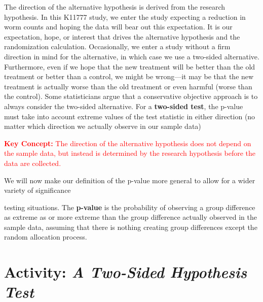 \documentclass[
]{report}
\theoremstyle{definition}
\theoremstyle{definition}
\theoremstyle{definition}
\theoremstyle{definition}
\theoremstyle{remark}
\begin{document}
The direction of the alternative hypothesis is derived from the research hypothesis. In this K11777 study, we
enter the study expecting a reduction in worm counts and hoping the data will bear out this expectation. It is
our expectation, hope, or interest that drives the alternative hypothesis and the randomization calculation. Occasionally,
we enter a study without a firm direction in mind for the alternative, in which case we use a two-sided
alternative. Furthermore, even if we hope that the new treatment will be better than the old treatment or better
than a control, we might be wrong---it may be that the new treatment is actually worse than the old treatment
or even harmful (worse than the control). Some statisticians argue that a conservative objective approach is to
always consider the two-sided alternative. For a \textbf{two-sided test}, the p-value must take into account extreme
values of the test statistic in either direction (no matter which direction we actually observe in our sample data)

\Large

\textbf{\textcolor{red}{Key Concept:}}
\textcolor{red}{The direction of the alternative hypothesis does not depend on the sample data, but instead is determined
by the research hypothesis before the data are collected.}

\normalsize

We will now make our definition of the p-value more general to allow for a wider variety of significance

testing situations. The \textbf{p-value} is the probability of observing a group difference as extreme as or more extreme
than the group difference actually observed in the sample data, assuming that there is nothing creating group
differences except the random allocation process.

\hypertarget{activity-a-two-sided-hypothesis-test}{%
\section*{\texorpdfstring{Activity: \emph{A Two-Sided Hypothesis Test}}{Activity: A Two-Sided Hypothesis Test}}\label{activity-a-two-sided-hypothesis-test}}
\end{document}
